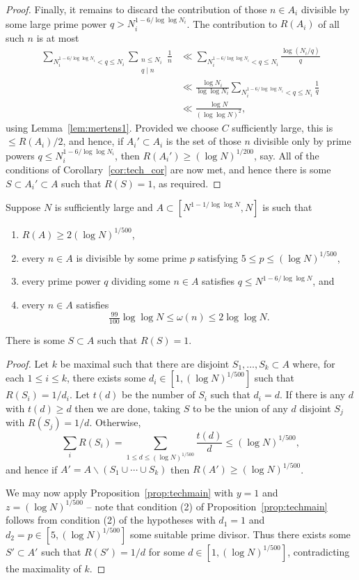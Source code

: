 \begin{proof}
Finally, it remains to discard the contribution of those $n\in A_i$ divisible by some large prime power $q> N_i^{1-6/\log\log N_i}$. The contribution to $R(A_i)$ of all such $n$ is at most
\begin{align*}
\sum_{N_i^{1-6/\log\log N_i}< q\leq N_i}\sum_{\substack{n\leq N_i\\ q\mid n}}\frac{1}{n}
&\ll \sum_{N_i^{1-6/\log\log N_i}< q\leq N_i}\frac{\log(N_i/q)}{q}\\
&\ll \frac{\log N_i}{\log\log N_i}\sum_{N_i^{1-6/\log\log N_i}<q\leq N_i}\frac{1}{q}\\
&\ll \frac{\log N}{(\log\log N)^2},
\end{align*}
using Lemma~\ref{lem:mertens1}. Provided we choose $C$ sufficiently large, this is $\leq R(A_i)/2$, and hence, if $A_i'\subset A_i$ is the set of those $n$ divisible only by prime powers $q\leq N_i^{1-6/\log\log N_i}$, then $R(A_i')\geq (\log N)^{1/200}$, say. All of the conditions of Corollary~\ref{cor:tech_cor} are now met, and hence there is some $S\subset A_i'\subset A$ such that $R(S)=1$, as required.
\end{proof}


\begin{corollary}\label{cor:tech_cor}
\leanok
Suppose $N$ is sufficiently large and $A\subset [N^{1-1/\log\log N},N]$ is such that
\begin{enumerate}
\item $R(A)\geq 2(\log N)^{1/500}$,
\item every $n\in A$ is divisible by some prime $p$ satisfying $5 \leq p \leq (\log N)^{1/500}$,
\item every prime power $q$ dividing some $n\in A$ satisfies $q\leq N^{1-6/\log\log N}$, and
\item every $n\in A$ satisfies
\[\tfrac{99}{100}\log\log N\leq \omega(n) \leq 2\log\log N.\]
\end{enumerate}
There is some $S\subset A$ such that $R(S)=1$.
\end{corollary}
\begin{proof}
\leanok
Let $k$ be maximal such that there are disjoint $S_1,\ldots,S_k\subset A$ where, for each $1\leq i\leq k$, there exists some $d_i\in [1,(\log N)^{1/500}]$ such that $R(S_i)=1/d_i$. Let $t(d)$ be the number of $S_i$ such that $d_i=d$. If there is any $d$ with $t(d)\geq d$ then we are done, taking $S$ to be the union of any $d$ disjoint $S_j$ with $R(S_j)=1/d$. Otherwise,
\[\sum_i R(S_i)= \sum_{1\leq d\leq (\log N)^{1/500}} \frac{t(d)}{d}\leq (\log N)^{1/500},\]
and hence if $A'=A\backslash (S_1\cup\cdots \cup S_k)$ then $R(A')\geq (\log N)^{1/500}$. 

We may now apply Proposition~\ref{prop:techmain} with $y=1$ and $z=(\log N)^{1/500}$ -- note that condition (2) of Proposition~\ref{prop:techmain} follows from condition (2) of the hypotheses with $d_1=1$ and $d_2=p\in [5,(\log N)^{1/500}]$ some suitable prime divisor. Thus there exists some $S'\subset A'$ such that $R(S')=1/d$ for some $d\in [1,(\log N)^{1/500}]$, contradicting the maximality of $k$.
\end{proof}

